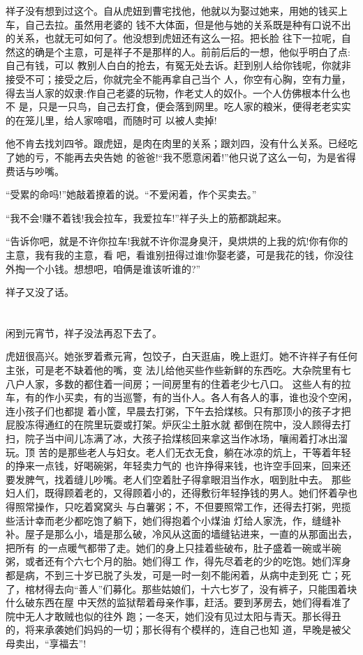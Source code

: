 \documentclass[11pt,a4paper,onecolumn]{article}
\begin{document}
祥子没有想到过这个。自从虎妞到曹宅找他，他就以为娶过她来，用她的钱买上车，自己去拉。虽然用老婆的
钱不大体面，但是他与她的关系既是种有口说不出的关系，也就无可如何了。他没想到虎妞还有这么一招。把长脸
往下一拉呢，自然这的确是个主意，可是祥子不是那样的人。前前后后的一想，他似乎明白了点:自己有钱，可以
教别人白白的抢去，有冤无处去诉。赶到别人给你钱呢，你就非接受不可；接受之后，你就完全不能再拿自己当个
人，你空有心胸，空有力量，得去当人家的奴隶:作自己老婆的玩物，作老丈人的奴仆。一个人仿佛根本什么也不
是，只是一只鸟，自己去打食，便会落到网里。吃人家的粮米，便得老老实实的在笼儿里，给人家啼唱，而随时可
以被人卖掉!

他不肯去找刘四爷。跟虎妞，是肉在肉里的关系；跟刘四，没有什么关系。已经吃了她的亏，不能再去央告她
的爸爸!``我不愿意闲着!''他只说了这么一句，为是省得费话与吵嘴。

``受累的命吗!''她敲着撩着的说。``不爱闲着，作个买卖去。''

``我不会!赚不着钱!我会拉车，我爱拉车!''祥子头上的筋都跳起来。

``告诉你吧，就是不许你拉车!我就不许你混身臭汗，臭烘烘的上我的炕!你有你的主意，我有我的主意，看
吧，看谁别扭得过谁!你娶老婆，可是我花的钱，你没往外掏一个小钱。想想吧，咱俩是谁该听谁的?''

祥子又没了话。

\pagebreak
\section{}

闲到元宵节，祥子没法再忍下去了。

虎妞很高兴。她张罗着煮元宵，包饺子，白天逛庙，晚上逛灯。她不许祥子有任何主张，可是老不缺着他的嘴，变
法儿给他买些作些新鲜的东西吃。大杂院里有七八户人家，多数的都住着一间房；一间房里有的住着老少七八口。
这些人有的拉车，有的作小买卖，有的当巡警，有的当仆人。各人有各人的事，谁也没个空闲，连小孩子们也都提
着小筐，早晨去打粥，下午去拾煤核。只有那顶小的孩子才把屁股冻得通红的在院里玩耍或打架。炉灰尘土脏水就
都倒在院中，没人顾得去打扫，院子当中间儿冻满了冰，大孩子拾煤核回来拿这当作冰场，嚷闹着打冰出溜玩。顶
苦的是那些老人与妇女。老人们无衣无食，躺在冰凉的炕上，干等着年轻的挣来一点钱，好喝碗粥，年轻卖力气的
也许挣得来钱，也许空手回来，回来还要发脾气，找着缝儿吵嘴。老人们空着肚子得拿眼泪当作水，咽到肚中去。
那些妇人们，既得顾着老的，又得顾着小的，还得敷衍年轻挣钱的男人。她们怀着孕也得照常操作，只吃着窝窝头
与白薯粥；不，不但要照常工作，还得去打粥，兜揽些活计\myrule 幸而老少都吃饱了躺下，她们得抱着个小煤油
灯给人家洗，作，缝缝补补。屋子是那么小，墙是那么破，冷风从这面的墙缝钻进来，一直的从那面出去，把所有
的一点暖气都带了走。她们的身上只挂着些破布，肚子盛着一碗或半碗粥，或者还有个六七个月的胎。她们得工
作，得先尽着老的少的吃饱。她们浑身都是病，不到三十岁已脱了头发，可是一时一刻不能闲着，从病中走到死
亡；死了，棺材得去向``善人''们募化。那些姑娘们，十六七岁了，没有裤子，只能围着块什么破东西在屋
中\myrule 天然的监狱\myrule 帮着母亲作事，赶活。要到茅房去，她们得看准了院中无人才敢贼也似的往外
跑；一冬天，她们没有见过太阳与青天。那长得丑的，将来承袭她们妈妈的一切；那长得有个模样的，连自己也知
道，早晚是被父母卖出，``享福去''!
\end{document}
